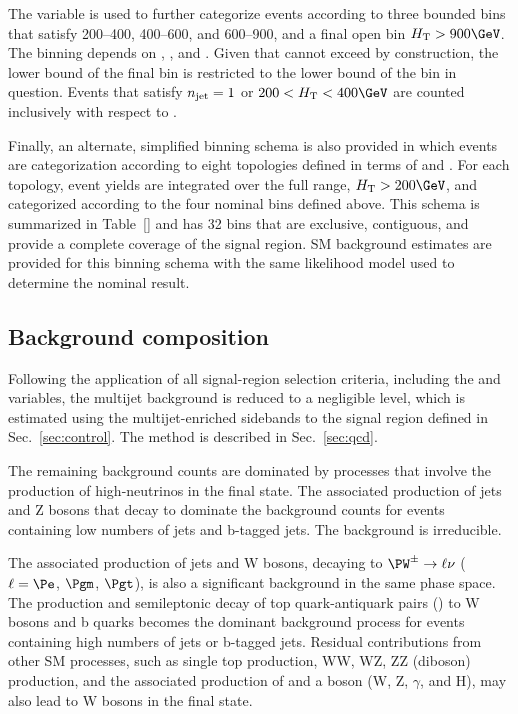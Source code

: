 The \mht variable is used to further categorize events according to
three bounded bins that satisfy 200--400, 400--600, and 600--900, and
a final open bin $\scalht > 900\GeV$. The \mht binning depends on
\njet, \nb, and \scalht. Given that \mht cannot exceed \scalht by
construction, the lower bound of the final \mht bin is restricted to
the lower bound of the \scalht bin in question. Events that satisfy
$n_{\text{jet}} = 1$ or $200 < \scalht < 400\GeV$ are counted inclusively with
respect to \mht.

Finally, an alternate, simplified binning schema is also provided in
which events are categorization according to eight topologies defined
in terms of \njet and \nb. For each topology, event yields are
integrated over the full \scalht range, $\scalht > 200\GeV$, and
categorized according to the four nominal \mht bins defined
above. This schema is summarized in Table~\ref{} and has 32 bins that
are exclusive, contiguous, and provide a complete coverage of the
signal region. SM background estimates are provided for this binning
schema with the same likelihood model used to determine the nominal
result.


\subsection{Background composition}
\label{sec:bkgd}

Following the application of all signal-region selection criteria,
including the \alphat and \bdphi variables, the multijet background is
reduced to a negligible level, which is estimated using the
multijet-enriched sidebands to the signal region defined in
Sec.~\ref{sec:control}. The method is described in
Sec.~\ref{sec:qcd}. 

The remaining background counts are dominated by processes that
involve the production of high-\pt neutrinos in the final state. The
associated production of jets and Z bosons that decay to \znunu
dominate the background counts for events containing low numbers of
jets and b-tagged jets. The \znunuj background is irreducible.

The associated production of jets and W bosons, decaying to $\PW^\pm
\to \ell\nu$ ($\ell=\Pe$, $\Pgm$, $\Pgt$), is also a significant
background in the same phase space. The production and semileptonic
decay of top quark-antiquark pairs (\ttbar) to W bosons and b quarks
becomes the dominant background process for events containing high
numbers of jets or b-tagged jets. Residual contributions from other SM
processes, such as single top production, WW, WZ, ZZ (diboson)
production, and the associated production of \ttbar and a boson
({\ttbar}W, {\ttbar}Z, {\ttbar}$\gamma$, and {\ttbar}H), may also lead
to W bosons in the final state.

